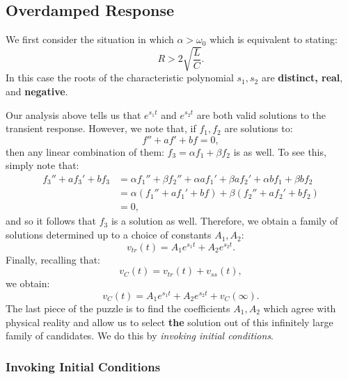 \documentclass[twoside]{article}
\begin{document}
\subsection{Overdamped Response}

We first consider the situation in which $\alpha > \omega_{0}$ which is equivalent to stating:
\[
    R > 2\sqrt{\frac{L}{C}}.
\]
In this case the roots of the characteristic polynomial $s_{1},s_{2}$ are \textbf{distinct, real}, and \textbf{negative}.

Our analysis above tells us that $e^{s_{1}t}$ and $e^{s_{2}t}$ are both valid solutions to the 
transient response. However, we note that, if $f_{1},f_{2}$ are solutions to:
\[
    f'' + af' + bf = 0,
\]
then any linear combination of them: $f_{3} = \alpha f_{1} + \beta f_{2}$ is as well. To see this, simply note that:
\begin{align*}
    f_{3}'' + af_{3}' + bf_{3} &= \alpha f_{1}'' + \beta f_{2}'' + \alpha a f_{1}' + \beta af_{2}' + \alpha bf_{1} + \beta bf_{2} \\ &= \alpha(f_{1}'' + af_{1}' + bf) + \beta(f_{2} '' + a f_{2}' + bf_{2}) \\
    &= 0,
\end{align*}
and so it follows that $f_{3}$ is a solution as well. Therefore, we obtain a family of solutions determined up to a choice of constants $A_{1},A_{2}$:
\[
    v_{tr}(t) = A_{1}e^{s_{1}t} + A_{2}e^{s_{2}t}.
\]
Finally, recalling that:
\[
    v_{C}(t) = v_{tr}(t) + v_{ss}(t),
\]
we obtain:
\[
    v_{C}(t) = A_{1}e^{s_{1}t} + A_{2}e^{s_{2}t} + v_{C}(\infty).
\]
The last piece of the puzzle is to find the coefficients $A_{1},A_{2}$ which agree with physical reality and allow us to select \textbf{the} solution out of this infinitely large family of candidates. We do this by \emph{invoking initial conditions}.

\subsubsection{Invoking Initial Conditions}
\end{document}
